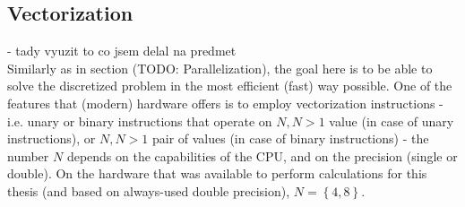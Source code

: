 \subsection{Vectorization}
- tady vyuzit to co jsem delal na predmet\\

Similarly as in section (TODO: Parallelization), the goal here is to be able to solve the discretized problem in the most efficient (fast) way possible. One of the features that (modern) hardware offers is to employ vectorization instructions - i.e. unary or binary instructions that operate on $N, N > 1$ value (in case of unary instructions), or $N, N > 1$ pair of values (in case of binary instructions) - the number $N$ depends on the capabilities of the CPU, and on the precision (single or double). On the hardware that was available to perform calculations for this thesis (and based on always-used double precision), $N = \left\{4, 8\right\}$.